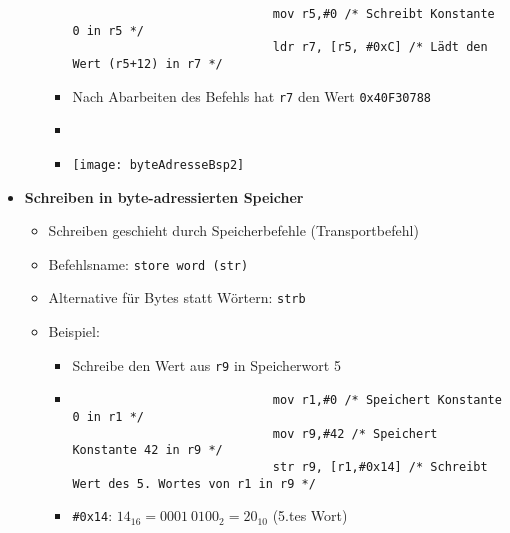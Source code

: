 \begin{itemize}
\begin{itemize}
\begin{itemize}
\begin{verbatim}
                            mov r5,#0 /* Schreibt Konstante 0 in r5 */
                            ldr r7, [r5, #0xC] /* Lädt den Wert (r5+12) in r7 */
                            \end{verbatim}
                        \item Nach Abarbeiten des Befehls hat \texttt{r7} den Wert \texttt{0x40F30788}
                        \item[]
                        \item[] \texttt{[image: byteAdresseBsp2]}
                    \end{itemize}
            \end{itemize}

        \item \textbf{Schreiben in byte-adressierten Speicher}
            \begin{itemize}
                \item Schreiben geschieht durch Speicherbefehle (Transportbefehl)
                \item Befehlsname: \texttt{store word (str)}
                \item Alternative für Bytes statt Wörtern: \texttt{strb}
                \item Beispiel:
                    \begin{itemize}
                        \item Schreibe den Wert aus \texttt{r9} in Speicherwort 5
                        \item[]
                            \begin{verbatim}
                            mov r1,#0 /* Speichert Konstante 0 in r1 */
                            mov r9,#42 /* Speichert Konstante 42 in r9 */
                            str r9, [r1,#0x14] /* Schreibt Wert des 5. Wortes von r1 in r9 */
                            \end{verbatim}
                        \item \texttt{\#0x14}: $14_{16} = 0001~0100_2 = 20_{10}$ (5.tes Wort)
                    \end{itemize}
            \end{itemize}
    \end{itemize}
        
